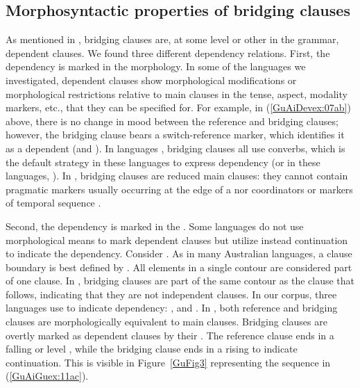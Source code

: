\documentclass[output=paper]{LSP/langsci}
\begin{document}
\subsection{Morphosyntactic properties of bridging clauses}
\label{GuAi2.3Morphosy.brid.cl}
As mentioned in , bridging clauses are, at some level or other in the grammar, dependent clauses. We found three different dependency relations. First, the dependency is marked in the morphology. In some of the languages we investigated, dependent clauses show morphological modifications or morphological restrictions relative to main clauses in the tense, aspect, modality markers, etc., that they can be specified for. For example, in (\ref{GuAiDevex:07ab}) above, there is no change in mood between the reference and bridging clauses; however, the bridging clause bears a switch-reference marker, which identifies it as a dependent (and ). In  languages , bridging clauses all use converbs, which is the default strategy in these languages to express dependency (or in these languages, ). In , bridging clauses are reduced main clauses: they cannot contain pragmatic markers usually occurring at the edge of a  nor coordinators or markers of temporal sequence . 

Second, the dependency is marked in the . Some languages do not use morphological means to mark dependent clauses but utilize instead continuation  to indicate the dependency. Consider  \citep[][5, 10]{McKay.2008}. As in many Australian languages, a clause boundary is best defined by . All elements in a single  contour are considered part of one clause. In , bridging clauses are part of the same  contour as the clause that follows, indicating that they are not independent clauses. In our corpus, three languages use  to indicate dependency:  ,   and  \citep{Pensalfini}. In , both reference and bridging clauses are morphologically equivalent to main clauses. Bridging clauses are overtly marked as dependent clauses by their . The reference clause ends in a falling or level , while the bridging clause ends in a rising  to indicate continuation. This is visible in Figure~\ref{GuFig3} representing the sequence in (\ref{GuAiGuex:11ac}). 
\end{document}
